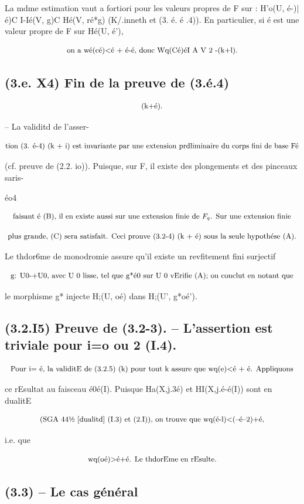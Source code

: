 \documentclass[11pt]{article}
\theoremstyle{remark}
\begin{document}
La mdme estimation vaut a fortiori pour les valeurs propres de F sur : H'o(U, é-)| é)C I-Ié(V, g)C Hé(V, ré*g) (K/.inneth et (3. é. é .4)). En particulier, si é est une valeur propre de F sur Hé(U, é'),

\[\text{\small on a wé(cé)<é + é-é, donc Wq(Cé)éI A V 2 -(k+l).}\]

\subsection*{(3.e. X4) Fin de la preuve de (3.é.4)}

\[\text{\small (k+é).}\]

-- La validitd de l'asser-

\[\text{\small tion (3. é-4) (k + i) est invariante par une extension prdliminaire du corps fini de base Fé}\]

(cf. preuve de (2.2. io)). Puisque, sur F, il existe des plongements et des pinceaux saris-

éo4

\[\text{\small faisant é (B), il en existe aussi sur une extension finie de \(F_q\). Sur une extension finie}\]

\[\text{\small plus grande, (C) sera satisfait. Ceci prouve (3.2-4) (k + é) sous la seule hypothése (A).}\]

Le thdor6me de monodromie assure qu'il existe un revfitement fini surjectif

\[\text{\small g: U0-+U0, avec U 0 lisse, tel que g*é0 sur U 0 vErifie (A); on conclut en notant que}\]

le morphisme g* injecte H;(U, oé) dans H;(U', g*oé').

\subsection*{(3.2.I5) Preuve de (3.2-3). -- L'assertion est triviale pour i=o ou 2 (I.4).}

\[\text{\small Pour i= é, la validitE de (3.2.5) (k) pour tout k assure que wq(e)<é + é. Appliquons}\]

ce rEsultat au faisceau é0é(I). Puisque Ha(X,j.3é) et HI(X,j.é-é(I)) sont en dualitE

\[\text{\small (SGA 44½ [dualitd] (I.3) et (2.I)), on trouve que wq(é-l)<(--é--2)+é,}\]

i.e. que

\[\text{\small wq(oé)>é+é. Le thdorEme en rEsulte.}\]

\subsection*{(3.3) -- Le cas général}
\end{document}
